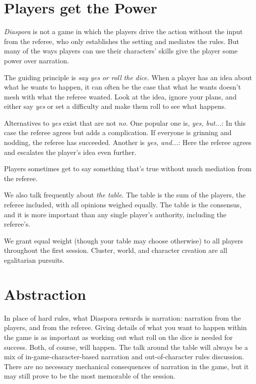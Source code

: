 \vfil
\section{Players get the Power}\label{sec:players-get-the-power}

\emph{Diaspora} is not a game in which the players drive the action without the input from the referee, who only establishes the setting and mediates the rules.  But many of the ways players can use their characters' skills give the player some power over narration.


The guiding principle is \emph{say yes or roll the dice.} When a player has an idea about what he wants to happen, it can often be the case that what he wants doesn't mesh with what the referee wanted. Look at the idea, ignore your plans, and either say \emph{yes} or set a difficulty and make them roll to see what happens.

Alternatives to \emph{yes} exist that are not \emph{no.} One popular one is, \emph{yes, but...}: In this case the referee agrees but adds a complication. If everyone is grinning and nodding, the referee has succeeded. Another is \emph{yes, and...}: Here the referee agrees and escalates the player's idea even further.

Players sometimes get to say something that's true without much mediation from the referee.

We also talk frequently about \emph{the table}. The table is the sum of the players, the referee included, with all opinions weighed equally. The table is the consensus, and it is more important than any single player's authority, including the referee's.


We grant equal weight (though your table may choose otherwise) to all players throughout the first session. Cluster, world, and character creation are all egalitarian pursuits.


\section{Abstraction}
\label{sec:abstraction}

% 

In place of hard rules, what Diaspora rewards is narration: narration from the players, and from the referee. Giving details of what you want to happen within the game is as important as working out what roll on the dice is needed for success. Both, of course, will happen. The talk around the table will always be a mix of in-game-character-based narration and out-of-character rules discussion. There are no necessary mechanical consequences of narration in the game, but it may still prove to be the most memorable of the session.

